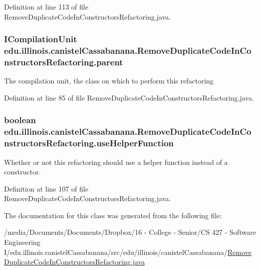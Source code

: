Definition at line 113 of file RemoveDuplicateCodeInConstructorsRefactoring.java.

\hypertarget{classedu_1_1illinois_1_1canistelCassabanana_1_1RemoveDuplicateCodeInConstructorsRefactoring_acbe93b494e0487fdf5e6cc379b2fd0dc}{
\subsubsection[{parent}]{\setlength{\rightskip}{0pt plus 5cm}ICompilationUnit {\bf edu.illinois.canistelCassabanana.RemoveDuplicateCodeInConstructorsRefactoring.parent}}}
\label{classedu_1_1illinois_1_1canistelCassabanana_1_1RemoveDuplicateCodeInConstructorsRefactoring_acbe93b494e0487fdf5e6cc379b2fd0dc}
The compilation unit, the class on which to perform this refactoring 

Definition at line 85 of file RemoveDuplicateCodeInConstructorsRefactoring.java.

\hypertarget{classedu_1_1illinois_1_1canistelCassabanana_1_1RemoveDuplicateCodeInConstructorsRefactoring_ac3d10235e0a51b7d76e5a34233a842ae}{
\subsubsection[{useHelperFunction}]{\setlength{\rightskip}{0pt plus 5cm}boolean {\bf edu.illinois.canistelCassabanana.RemoveDuplicateCodeInConstructorsRefactoring.useHelperFunction}}}
\label{classedu_1_1illinois_1_1canistelCassabanana_1_1RemoveDuplicateCodeInConstructorsRefactoring_ac3d10235e0a51b7d76e5a34233a842ae}
Whether or not this refactoring should use a helper function instead of a constructor. 

Definition at line 107 of file RemoveDuplicateCodeInConstructorsRefactoring.java.



The documentation for this class was generated from the following file:\begin{DoxyCompactItemize}
\item 
/media/Documents/Documents/Dropbox/16 -\/ College -\/ Senior/CS 427 -\/ Software Engineering I/edu.illinois.canistelCassabanana/src/edu/illinois/canistelCassabanana/\hyperlink{RemoveDuplicateCodeInConstructorsRefactoring_8java}{RemoveDuplicateCodeInConstructorsRefactoring.java}\end{DoxyCompactItemize}
